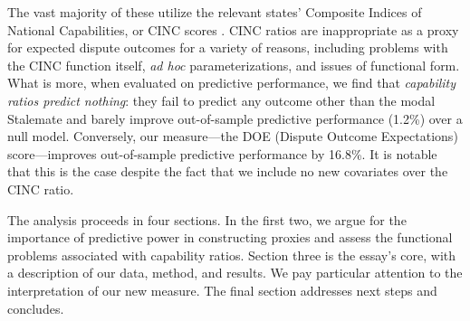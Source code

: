The vast majority of these utilize the relevant states' Composite Indices of National Capabilities, or CINC scores \citep{singer1972}. CINC ratios are inappropriate as a proxy for expected dispute outcomes for a variety of reasons, including problems with the CINC function itself, \emph{ad hoc} parameterizations, and issues of functional form. 
What is more, when evaluated on predictive performance, we find that \emph{capability ratios predict nothing}: they fail to predict any outcome other than the modal Stalemate and barely improve out-of-sample predictive performance (1.2\%) over a null model. 
Conversely, our measure---the DOE (Dispute Outcome Expectations) score---improves out-of-sample predictive performance by 16.8\%. 
It is notable that this is the case despite the fact that we include no new covariates over the CINC ratio.

The analysis proceeds in four sections. 
In the first two, we argue for the importance of predictive power in constructing proxies and assess the functional problems associated with capability ratios. 
Section three is the essay's core, with a description of our data, method, and results. 
We pay particular attention to the interpretation of our new measure. 
The final section addresses next steps and concludes. 

